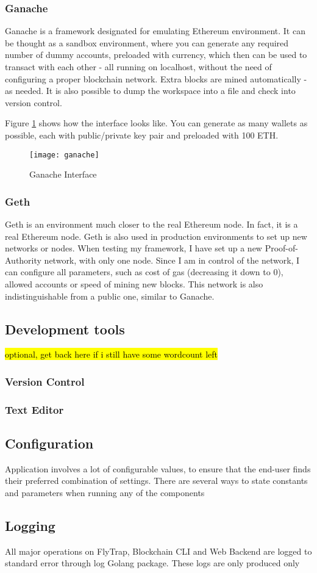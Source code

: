 \subsubsection{Ganache}
Ganache\cite{lee2019testing} is a framework designated for emulating Ethereum environment. It can be thought as a sandbox environment, where you can generate any required number of dummy accounts, preloaded with currency, which then can be used to transact with each other - all running on localhost, without the need of configuring a proper blockchain network. Extra blocks are mined automatically - as needed. It is also possible to dump the workspace into a file and check into version control.

Figure \ref{fig:ganache} shows how the interface looks like. You can generate as many wallets as possible, each with public/private key pair and preloaded with 100 ETH.
\begin{figure}[h]
    \centering
    \texttt{[image: ganache]}
    \caption{Ganache Interface}
    \label{fig:ganache}
\end{figure}

\subsubsection{Geth}
Geth is an environment much closer to the real Ethereum node. In fact, it is a real Ethereum node. Geth is also used in production environments to set up new networks or nodes. When testing my framework, I have set up a new Proof-of-Authority network, with only one node. Since I am in control of the network, I can configure all parameters, such as cost of gas (decreasing it down to 0), allowed accounts or speed of mining new blocks. This network is also indistinguishable from a public one, similar to Ganache.
\subsection{Development tools}
\hl{optional, get back here if i still have some wordcount left}
\subsubsection{Version Control}
\subsubsection{Text Editor}

\subsection{Configuration}
Application involves a lot of configurable values, to ensure that the end-user finds their preferred combination of settings. There are several ways to state constants and parameters when running any of the components 

\subsection{Logging}
All major operations on FlyTrap, Blockchain CLI and Web Backend are logged to standard error through log Golang package. These logs are only produced only 

